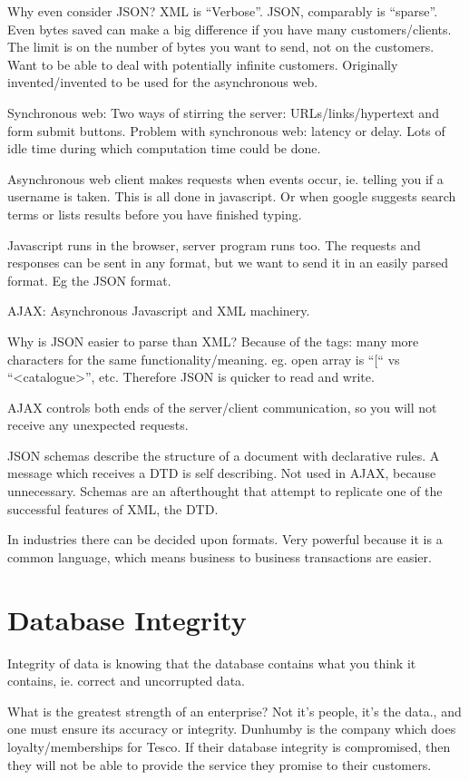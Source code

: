 \documentclass[11pt]{article}
\begin{document}
Why even consider JSON? XML is “Verbose”. JSON, comparably is “sparse”. Even bytes saved can make a big difference if you have many customers/clients. The limit is on the number of bytes you want to send, not on the customers. Want to be able to deal with potentially infinite customers. Originally invented/invented to be used for the asynchronous web.

Synchronous web:
Two ways of stirring the server: URLs/links/hypertext and form submit buttons.
Problem with synchronous web: latency or delay. Lots of idle time during which computation time could be done.

Asynchronous web
client makes requests when events occur, ie. telling you if a username is taken. This is all done in javascript. Or when google suggests search terms or lists results before you have finished typing.

Javascript runs in the browser, server program runs too. The requests and responses can be sent in any format, but we want to send it in an easily parsed format. Eg the JSON format.

AJAX: Asynchronous Javascript and XML machinery.

Why is JSON easier to parse than XML? Because of the tags: many more characters for the same functionality/meaning. eg. open array is “[“ vs “<catalogue>”, etc. Therefore JSON is quicker to read and write.

AJAX controls both ends of the server/client communication, so you will not receive any unexpected requests.

JSON schemas describe the structure of a document with declarative rules. A message which receives a DTD is self describing. Not used in AJAX, because unnecessary. Schemas are an afterthought that attempt to replicate one of the successful features of XML, the DTD.

In industries there can be decided upon formats. Very powerful because it is a common language, which means business to business transactions are easier.



\section{Database Integrity}

Integrity of data is knowing that the database contains what you think it contains, ie. correct and uncorrupted data.

What is the greatest strength of an enterprise? Not it’s people, it’s the data., and one must ensure its accuracy or integrity. Dunhumby is the company which does loyalty/memberships for Tesco. If their database integrity is compromised, then they will not be able to provide the service they promise to their customers.
\end{document}
